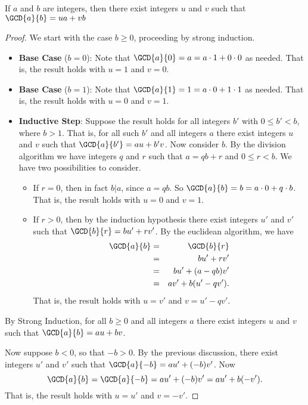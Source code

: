 \documentclass{article}
\begin{document}

\begin{thm}
If $a$ and $b$ are integers, then there exist integers $u$ and $v$ such that $\GCD{a}{b} = ua + vb$
\end{thm}

\begin{proof}
We start with the case $b \geq 0$, proceeding by strong induction.
\begin{itemize}
\item \textbf{Base Case} ($b = 0$): Note that $\GCD{a}{0} = a = a \cdot 1 + 0 \cdot 0$ as needed. That is, the result holds with $u = 1$ and $v = 0$.
\item \textbf{Base Case} ($b = 1$): Note that $\GCD{a}{1} = 1 = a \cdot 0 + 1 \cdot 1$ as needed. That is, the result holds with $u = 0$ and $v = 1$.
\item \textbf{Inductive Step}: Suppose the result holds for all integers $b'$ with $0 \leq b' < b$, where $b > 1$. That is, for all such $b'$ and all integers $a$ there exist integers $u$ and $v$ such that $\GCD{a}{b'} = au + b'v$. Now consider $b$. By the division algorithm we have integers $q$ and $r$ such that $a = qb + r$ and $0 \leq r < b$. We have two possibilities to consider.
\begin{itemize}
\item If $r = 0$, then in fact $b|a$, since $a = qb$. So $\GCD{a}{b} = b = a \cdot 0 + q \cdot b$. That is, the result holds with $u = 0$ and $v = 1$.
\item If $r > 0$, then by the induction hypothesis there exist integers $u'$ and $v'$ such that $\GCD{b}{r} = bu' + rv'$. By the euclidean algorithm, we have
\begin{eqnarray*}
\GCD{a}{b} & = & \GCD{b}{r} \\
 & = & bu' + rv' \\
 & = & bu' + (a - qb)v' \\
 & = & av' + b(u' - qv').
\end{eqnarray*}
That is, the result holds with $u = v'$ and $v = u' - qv'$.
\end{itemize}
\end{itemize}
By Strong Induction, for all $b \geq 0$ and all integers $a$ there exist integers $u$ and $v$ such that $\GCD{a}{b} = au + bv$.

Now suppose $b < 0$, so that $-b > 0$. By the previous discussion, there exist integers $u'$ and $v'$ such that $\GCD{a}{-b} = au' + (-b)v'$. Now \[ \GCD{a}{b} = \GCD{a}{-b} = au' + (-b)v' = au' + b(-v'). \] That is, the result holds with $u = u'$ and $v = -v'$.  
\end{proof}
\end{document}
